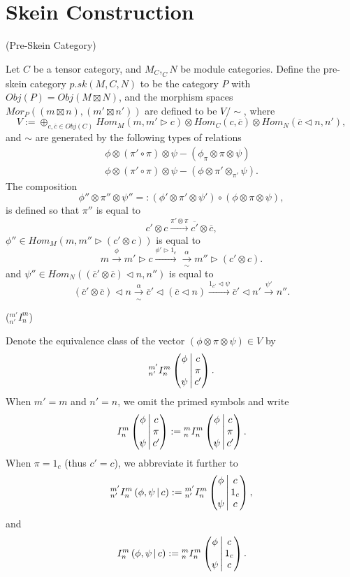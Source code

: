 \section{Skein Construction}\label{section/skein-construction}

\begin{definition} (Pre-Skein Category)

  \noindent Let $C$ be a tensor category, and $M_{C}, _{C}N$ be module
  categories. Define the pre-skein category $p.sk(M,C,N)$ to be the category
  $P$ with $Obj(P) = Obj(M \boxtimes N)$, and the morphism spaces
  $Mor_{P}((m \boxtimes n), (m' \boxtimes n'))$ are defined to be $V / \sim$,
  where
  \[
    V := \oplus_{c,\overline{c} \in Obj(C)} Hom_{M}(m, m' \rhd c) \otimes Hom_{C}(c,\overline{c}) \otimes Hom_{N} (\overline{c} \lhd n, n'),
  \]
  and $\sim$ are generated by the following types of relations
  \begin{align}
    \phi \otimes (\pi' \circ \pi) \otimes \psi - (\phi_{\pi} \otimes \pi \otimes \psi)\\
    \phi \otimes (\pi' \circ \pi) \otimes \psi - (\phi \otimes \pi' \otimes _{\pi'}\psi).
  \end{align}
  The composition
  \[
    \phi'' \otimes \pi'' \otimes \psi'' =:
    (\phi' \otimes \pi' \otimes \psi' ) \circ (
    \phi \otimes \pi \otimes \psi ),
  \]
  is defined so that $\pi''$ is equal to
  \[
    c' \otimes c \xrightarrow{\pi' \otimes \pi} \overline{c'} \otimes \overline{c},
  \]
  \noindent $\phi'' \in Hom_{M}(m, m'' \rhd (c' \otimes c))$ is equal to
  \[
    m \xrightarrow{\phi} m' \rhd c \xrightarrow{\phi' \rhd 1_{c}} \xrightarrow[\sim]{\alpha} m'' \rhd (c' \otimes c).
  \]
  \noindent and $\psi'' \in Hom_{N}((\overline{c}' \otimes \overline{c}) \lhd n, n'')$ is equal to
  \[
    (\overline{c}' \otimes \overline{c}) \lhd n \xrightarrow[\sim]{\alpha} \overline{c}' \lhd (\overline{c} \lhd n) \xrightarrow{1_{\overline{c}'} \lhd \psi} \overline{c}' \lhd n' \xrightarrow{\psi'} n''.
  \]

\end{definition}

\begin{notation} (${}^{m'}_{n'}I^{m}_{n}$)

  \noindent Denote the equivalence class of the vector
  $(\phi \otimes \pi \otimes \psi) \in V$ by
  \[{}^{m'}_{n'} I^{m}_{n} \left( \begin{matrix} \phi \\ {}\\ \psi \end{matrix} \,\middle|\, \begin{matrix} c \\ \pi \\ c' \end{matrix} \right).\]
  When $m' = m$ and $n' = n$, we omit the primed symbols and write
  \[
    {}^{}_{} I^{m}_{n} \left( \begin{matrix} \phi \\ {}\\ \psi \end{matrix} \,\middle|\, \begin{matrix} c \\ \pi \\ c' \end{matrix} \right) :=
    {}^{m}_{n} I^{m}_{n} \left( \begin{matrix} \phi \\ {}\\ \psi \end{matrix} \,\middle|\, \begin{matrix} c \\ \pi \\ c' \end{matrix} \right).
  \]
  When $\pi = 1_{c}$ (thus $c' = c$), we abbreviate it further to
  \[
    {}^{m'}_{n'} I^{m}_{n} \left( \phi, \psi \,\middle|\, c \right) :=
    {}^{m'}_{n'} I^{m}_{n} \left( \begin{matrix} \phi \\ {}\\ \psi \end{matrix} \,\middle|\, \begin{matrix} c \\ 1_{c} \\ c \end{matrix} \right),
  \]
  and
  \[
    {}^{}_{} I^{m}_{n} \left( \phi, \psi \,\middle|\, c \right) :=
    {}^{m}_{n} I^{m}_{n} \left( \begin{matrix} \phi \\ {}\\ \psi \end{matrix} \,\middle|\, \begin{matrix} c \\ 1_{c} \\ c \end{matrix} \right).
  \]
\end{notation}

